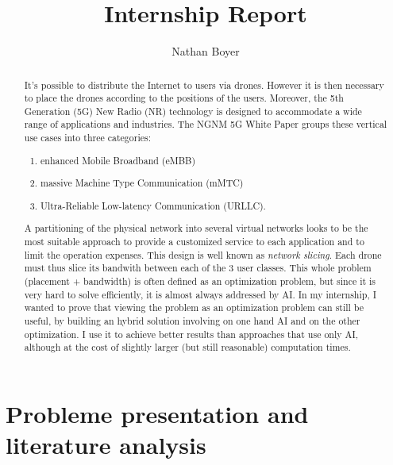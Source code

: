 \documentclass[letterpaper]{article}
\title{Internship Report}
\author{Nathan Boyer}
\begin{document}
\maketitle

\begin{abstract}

    It's possible to distribute the Internet to users via drones.
    However it is then necessary to place the drones according to the positions of the users.
    Moreover, the 5th Generation (5G) New Radio (NR) technology is designed to accommodate a wide range of applications and industries. The NGNM 5G White Paper \cite{5gwhitepaper} groups these vertical use cases into three categories:
    \begin{enumerate}
        \item enhanced Mobile Broadband (eMBB)
        \item massive Machine Type Communication (mMTC)
        \item Ultra-Reliable Low-latency Communication (URLLC).
    \end{enumerate}

    A partitioning of the physical network into several virtual networks looks to be the most suitable approach to provide a customized service to each application and to limit the operation expenses. This design is well known as \textit{network slicing}.
    Each drone must thus slice its bandwith between each of the 3 user classes.
    This whole problem (placement + bandwidth) is often defined as an optimization problem, but since it is very hard to solve efficiently, it is almost always addressed by AI.
    In my internship, I wanted to prove that viewing the problem as an optimization problem can still be useful, by building an hybrid solution involving on one hand AI and on the other optimization.
    I use it to achieve better results than approaches that use only AI, although at the cost of slightly larger (but still reasonable) computation times.
\end{abstract}


\section{Probleme presentation and literature analysis}
\end{document}
